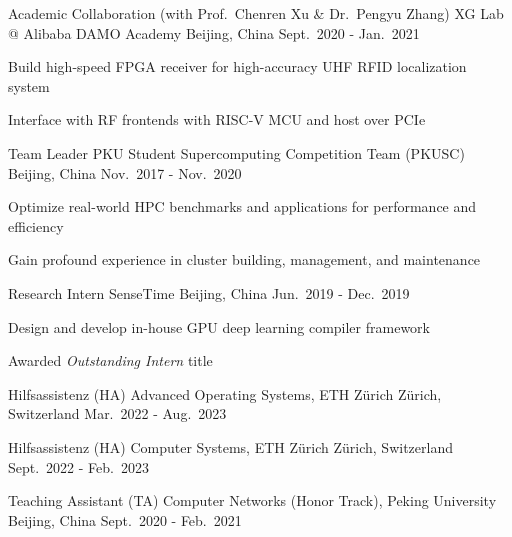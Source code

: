 \begin{cventries}
  \cventry
    {Academic Collaboration (with Prof.\ Chenren Xu \& Dr.\ Pengyu Zhang)} %
    {XG Lab @ Alibaba DAMO Academy} %
    {Beijing, China} %
    {Sept.\ 2020 - Jan.\ 2021} %
    {
      \begin{cvitems} %
        \item {Build high-speed FPGA receiver for high-accuracy UHF RFID localization system}
        \item {Interface with RF frontends with RISC-V MCU and host over PCIe}
      \end{cvitems}
    }

  \cventry
    {Team Leader} %
    {PKU Student Supercomputing Competition Team (PKUSC)} %
    {Beijing, China} %
    {Nov.\ 2017 - Nov.\ 2020} %
    {
      \begin{cvitems} %
        \item {Optimize real-world HPC benchmarks and applications for performance and efficiency}
        \item {Gain profound experience in cluster building, management, and maintenance}
      \end{cvitems}
    }

\end{cventries}


\begin{cventries}
    \cventry
    {Research Intern}
    {SenseTime}
    {Beijing, China}
    {Jun.\ 2019 - Dec.\ 2019}
    {
        \begin{cvitems}
        \item {Design and develop in-house GPU deep learning compiler framework}
        \item {Awarded \textit{Outstanding Intern} title}
        \end{cvitems}
    }
\end{cventries}


\begin{cventries}
    \cventry
    {Hilfsassistenz (HA)}
    {Advanced Operating Systems, ETH Z\"urich}
    {Z\"urich, Switzerland}
    {Mar.\ 2022 - Aug.\ 2023}
    {}

    \cventry
    {Hilfsassistenz (HA)}
    {Computer Systems, ETH Z\"urich}
    {Z\"urich, Switzerland}
    {Sept.\ 2022 - Feb.\ 2023}
    {}

    \cventry
    {Teaching Assistant (TA)}
    {Computer Networks (Honor Track), Peking University}
    {Beijing, China}
    {Sept.\ 2020 - Feb.\ 2021}
    {}
\end{cventries}
